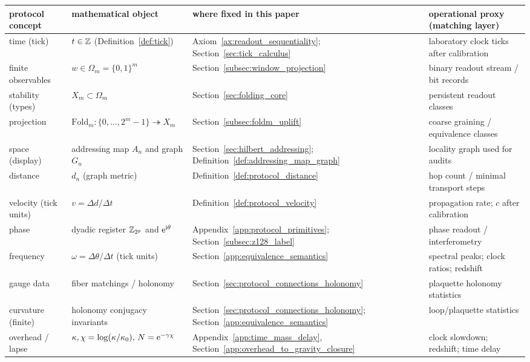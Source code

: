 \begin{table}[t]
\centering
\scriptsize
\setlength{\tabcolsep}{6pt}
\renewcommand{\arraystretch}{1.15}
\begin{tabular}{p{} p{} p{} p{}}
\toprule
protocol concept & mathematical object & where fixed in this paper & operational proxy (matching layer) \\
\midrule
time (tick) & $t\in\mathbb{Z}$ (Definition~\ref{def:tick}) & Axiom~\ref{ax:readout_sequentiality}; Section~\ref{sec:tick_calculus} & laboratory clock ticks after calibration \\
finite observables & $w\in\Omega_m=\{0,1\}^m$ & Section~\ref{subsec:window_projection} & binary readout stream / bit records \\
stability (types) & $X_m\subset\Omega_m$ & Section~\ref{sec:folding_core} & persistent readout classes \\
projection & $\mathrm{Fold}_m:\{0,\dots,2^m-1\}\twoheadrightarrow X_m$ & Section~\ref{subsec:foldm_uplift} & coarse graining / equivalence classes \\
space (display) & addressing map $A_n$ and graph $G_n$ & Section~\ref{sec:hilbert_addressing}; Definition~\ref{def:addressing_map_graph} & locality graph used for audits \\
distance & $d_n$ (graph metric) & Definition~\ref{def:protocol_distance} & hop count / minimal transport steps \\
velocity (tick units) & $v=\Delta d/\Delta t$ & Definition~\ref{def:protocol_velocity} & propagation rate; $c$ after calibration \\
phase & dyadic register $\mathbb{Z}_{2^p}$ and $\mathrm{e}^{\mathrm{i}\theta}$ & Appendix~\ref{app:protocol_primitives}; Section~\ref{subsec:z128_label} & phase readout / interferometry \\
frequency & $\omega=\Delta\theta/\Delta t$ (tick units) & Section~\ref{app:equivalence_semantics} & spectral peaks; clock ratios; redshift \\
gauge data & fiber matchings / holonomy & Section~\ref{sec:protocol_connections_holonomy} & plaquette holonomy statistics \\
curvature (finite) & holonomy conjugacy invariants & Section~\ref{sec:protocol_connections_holonomy}; Section~\ref{app:equivalence_semantics} & loop/plaquette statistics \\
overhead / lapse & $\kappa,\chi=\log(\kappa/\kappa_0),\,N=\mathrm{e}^{-\gamma\chi}$ & Appendix~\ref{app:time_mass_delay}, Section~\ref{app:overhead_to_gravity_closure} & clock slowdown; redshift; time delay \\

\end{tabular}
\end{table}
